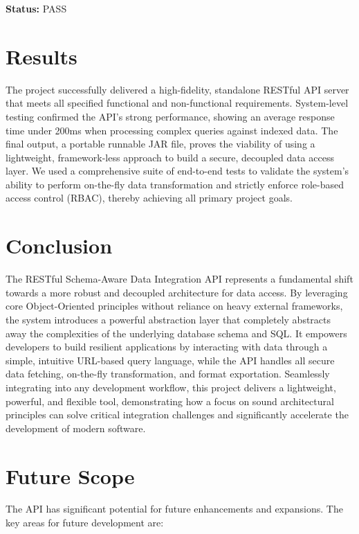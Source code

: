 \documentclass[12pt, a4paper]{report}
\begin{document}
\noindent\textbf{Status:} PASS

\clearpage

\chapter{Results}
The project successfully delivered a high-fidelity, standalone RESTful API server that meets all specified functional and non-functional requirements. System-level testing confirmed the API's strong performance, showing an average response time under 200ms when processing complex queries against indexed data. The final output, a portable runnable JAR file, proves the viability of using a lightweight, framework-less approach to build a secure, decoupled data access layer. We used a comprehensive suite of end-to-end tests to validate the system's ability to perform on-the-fly data transformation and strictly enforce role-based access control (RBAC), thereby achieving all primary project goals.

\chapter{Conclusion}
The RESTful Schema-Aware Data Integration API represents a fundamental shift towards a more robust and decoupled architecture for data access. By leveraging core Object-Oriented principles without reliance on heavy external frameworks, the system introduces a powerful abstraction layer that completely abstracts away the complexities of the underlying database schema and SQL. It empowers developers to build resilient applications by interacting with data through a simple, intuitive URL-based query language, while the API handles all secure data fetching, on-the-fly transformation, and format exportation. Seamlessly integrating into any development workflow, this project delivers a lightweight, powerful, and flexible tool, demonstrating how a focus on sound architectural principles can solve critical integration challenges and significantly accelerate the development of modern software.

\chapter{Future Scope}
The API has significant potential for future enhancements and expansions. The key areas for future development are:
\end{document}
